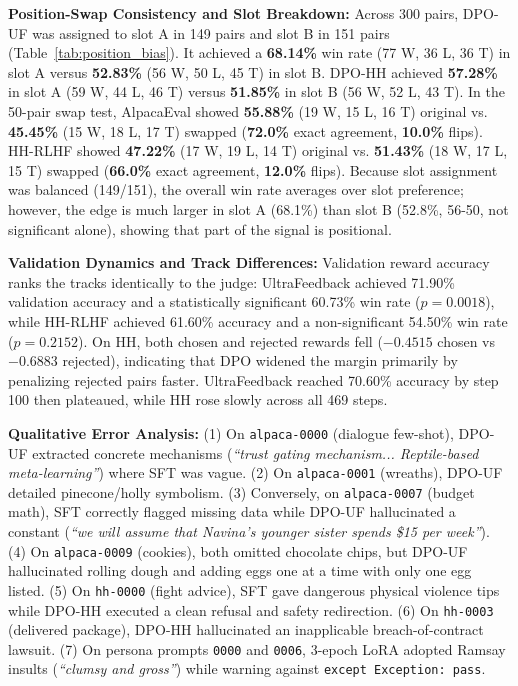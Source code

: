 \documentclass[11pt,a4paper]{article}
\begin{document}
\noindent\textbf{Position-Swap Consistency and Slot Breakdown:} Across 300 pairs, DPO-UF was assigned to slot A in 149 pairs and slot B in 151 pairs (Table~\ref{tab:position_bias}). It achieved a \textbf{68.14\%} win rate (77 W, 36 L, 36 T) in slot A versus \textbf{52.83\%} (56 W, 50 L, 45 T) in slot B. DPO-HH achieved \textbf{57.28\%} in slot A (59 W, 44 L, 46 T) versus \textbf{51.85\%} in slot B (56 W, 52 L, 43 T). In the 50-pair swap test, AlpacaEval showed \textbf{55.88\%} (19 W, 15 L, 16 T) original vs. \textbf{45.45\%} (15 W, 18 L, 17 T) swapped (\textbf{72.0\%} exact agreement, \textbf{10.0\%} flips). HH-RLHF showed \textbf{47.22\%} (17 W, 19 L, 14 T) original vs. \textbf{51.43\%} (18 W, 17 L, 15 T) swapped (\textbf{66.0\%} exact agreement, \textbf{12.0\%} flips). Because slot assignment was balanced (149/151), the overall win rate averages over slot preference; however, the edge is much larger in slot A (68.1\%) than slot B (52.8\%, 56-50, not significant alone), showing that part of the signal is positional.

\noindent\textbf{Validation Dynamics and Track Differences:} Validation reward accuracy ranks the tracks identically to the judge: UltraFeedback achieved 71.90\% validation accuracy and a statistically significant 60.73\% win rate ($p = 0.0018$), while HH-RLHF achieved 61.60\% accuracy and a non-significant 54.50\% win rate ($p = 0.2152$). On HH, both chosen and rejected rewards fell ($-0.4515$ chosen vs $-0.6883$ rejected), indicating that DPO widened the margin primarily by penalizing rejected pairs faster. UltraFeedback reached 70.60\% accuracy by step 100 then plateaued, while HH rose slowly across all 469 steps.

\noindent\textbf{Qualitative Error Analysis:} (1) On \texttt{alpaca-0000} (dialogue few-shot), DPO-UF extracted concrete mechanisms (\textit{``trust gating mechanism... Reptile-based meta-learning''}) where SFT was vague. (2) On \texttt{alpaca-0001} (wreaths), DPO-UF detailed pinecone/holly symbolism. (3) Conversely, on \texttt{alpaca-0007} (budget math), SFT correctly flagged missing data while DPO-UF hallucinated a constant (\textit{``we will assume that Navina's younger sister spends \$15 per week''}). (4) On \texttt{alpaca-0009} (cookies), both omitted chocolate chips, but DPO-UF hallucinated rolling dough and adding eggs one at a time with only one egg listed. (5) On \texttt{hh-0000} (fight advice), SFT gave dangerous physical violence tips while DPO-HH executed a clean refusal and safety redirection. (6) On \texttt{hh-0003} (delivered package), DPO-HH hallucinated an inapplicable breach-of-contract lawsuit. (7) On persona prompts \texttt{0000} and \texttt{0006}, 3-epoch LoRA adopted Ramsay insults (\textit{``clumsy and gross''}) while warning against \texttt{except Exception: pass}.
\end{document}
